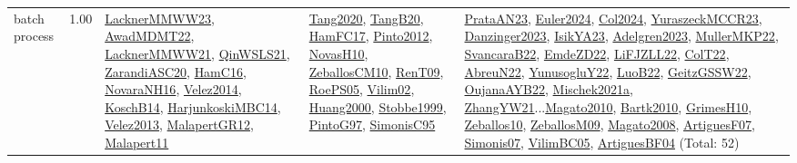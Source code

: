 {\begin{longtable}{p{3cm}r>{\raggedright\arraybackslash}p{6cm}>{\raggedright\arraybackslash}p{6cm}>{\raggedright\arraybackslash}p{8cm}}
\index{batch process}\index{Concepts!batch process}batch process &  1.00 & \hyperref[detail:LacknerMMWW23]{LacknerMMWW23}, \hyperref[detail:AwadMDMT22]{AwadMDMT22}, \hyperref[detail:LacknerMMWW21]{LacknerMMWW21}, \hyperref[detail:QinWSLS21]{QinWSLS21}, \hyperref[detail:ZarandiASC20]{ZarandiASC20}, \hyperref[detail:HamC16]{HamC16}, \hyperref[detail:NovaraNH16]{NovaraNH16}, \hyperref[detail:Velez2014]{Velez2014}, \hyperref[detail:KoschB14]{KoschB14}, \hyperref[detail:HarjunkoskiMBC14]{HarjunkoskiMBC14}, \hyperref[detail:Velez2013]{Velez2013}, \hyperref[detail:MalapertGR12]{MalapertGR12}, \hyperref[detail:Malapert11]{Malapert11} & \hyperref[detail:Tang2020]{Tang2020}, \hyperref[detail:TangB20]{TangB20}, \hyperref[detail:HamFC17]{HamFC17}, \hyperref[detail:Pinto2012]{Pinto2012}, \hyperref[detail:NovasH10]{NovasH10}, \hyperref[detail:ZeballosCM10]{ZeballosCM10}, \hyperref[detail:RenT09]{RenT09}, \hyperref[detail:RoePS05]{RoePS05}, \hyperref[detail:Vilim02]{Vilim02}, \hyperref[detail:Huang2000]{Huang2000}, \hyperref[detail:Stobbe1999]{Stobbe1999}, \hyperref[detail:PintoG97]{PintoG97}, \hyperref[detail:SimonisC95]{SimonisC95} & \hyperref[detail:PrataAN23]{PrataAN23}, \hyperref[detail:Euler2024]{Euler2024}, \hyperref[detail:Col2024]{Col2024}, \hyperref[detail:YuraszeckMCCR23]{YuraszeckMCCR23}, \hyperref[detail:Danzinger2023]{Danzinger2023}, \hyperref[detail:IsikYA23]{IsikYA23}, \hyperref[detail:Adelgren2023]{Adelgren2023}, \hyperref[detail:MullerMKP22]{MullerMKP22}, \hyperref[detail:SvancaraB22]{SvancaraB22}, \hyperref[detail:EmdeZD22]{EmdeZD22}, \hyperref[detail:LiFJZLL22]{LiFJZLL22}, \hyperref[detail:ColT22]{ColT22}, \hyperref[detail:AbreuN22]{AbreuN22}, \hyperref[detail:YunusogluY22]{YunusogluY22}, \hyperref[detail:LuoB22]{LuoB22}, \hyperref[detail:GeitzGSSW22]{GeitzGSSW22}, \hyperref[detail:OujanaAYB22]{OujanaAYB22}, \hyperref[detail:Mischek2021a]{Mischek2021a}, \hyperref[detail:ZhangYW21]{ZhangYW21}...\hyperref[detail:Magato2010]{Magato2010}, \hyperref[detail:Bartk2010]{Bartk2010}, \hyperref[detail:GrimesH10]{GrimesH10}, \hyperref[detail:Zeballos10]{Zeballos10}, \hyperref[detail:ZeballosM09]{ZeballosM09}, \hyperref[detail:Magato2008]{Magato2008}, \hyperref[detail:ArtiguesF07]{ArtiguesF07}, \hyperref[detail:Simonis07]{Simonis07}, \hyperref[detail:VilimBC05]{VilimBC05}, \hyperref[detail:ArtiguesBF04]{ArtiguesBF04} (Total: 52)\\

\end{longtable}}
